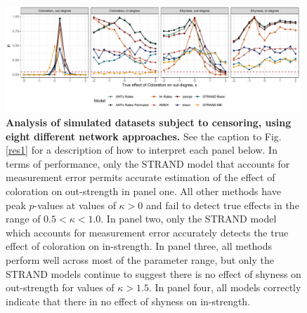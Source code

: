 \documentclass[Afour,sageh,times]{sagej}
\begin{document}
\begin{figure}[t]
  \caption{\textbf{Analysis of simulated datasets subject to censoring, using eight different network approaches.} See the caption to Fig. \ref{res1} for a description of how to interpret each panel below. In terms of performance, only the STRAND model that accounts for measurement error permits accurate estimation of the effect of coloration on out-strength in panel one. All other methods have peak $p$-values at values of $\kappa>0$ and fail to detect true effects in the range of $0.5<\kappa<1.0$. In panel two, only the STRAND model which accounts for measurement error accurately detects the true effect of coloration on in-strength. In panel three, all methods perform well across most of the parameter range, but only the STRAND models continue to suggest there is no effect of shyness on out-strength for values of $\kappa>1.5$.   In panel four, all models correctly indicate that there in no effect of shyness on in-strength. }  \label{res3}
  \centering
    \includegraphics[width=0.99\textwidth]{Figures/Censoring_model}
\end{figure}
\end{document}
